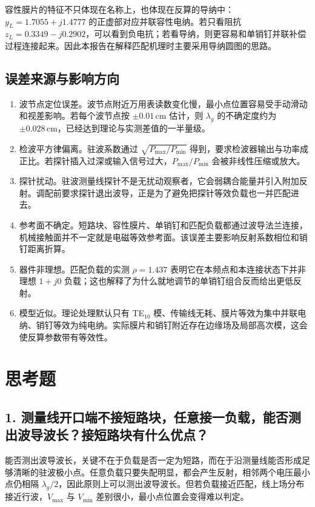 \documentclass[UTF8]{ctexart}
\begin{document}
容性膜片的特征不只体现在名称上，也体现在反算的导纳中：$y_L=1.7055+j1.4777$ 的正虚部对应并联容性电纳。若只看阻抗 $z_L=0.3349-j0.2902$，可以看到负电抗；若看导纳，则更容易和单销钉并联补偿过程连接起来。因此本报告在解释匹配机理时主要采用导纳圆图的思路。

\subsection{误差来源与影响方向}

\begin{enumerate}
  \item 波节点定位误差。波节点附近万用表读数变化慢，最小点位置容易受手动滑动和视差影响。若每个波节点按 $\pm0.01\,\mathrm{cm}$ 估计，则 $\lambda_g$ 的不确定度约为 $\pm0.028\,\mathrm{cm}$，已经达到理论与实测差值的一半量级。
  \item 检波平方律偏离。驻波系数通过 $\sqrt{P_{\max}/P_{\min}}$ 得到，要求检波器输出与功率成正比。若探针插入过深或输入信号过大，$P_{\max}/P_{\min}$ 会被非线性压缩或放大。
  \item 探针扰动。驻波测量线探针不是无扰动观察者，它会弱耦合能量并引入附加反射。调配前要求探针退出波导，正是为了避免把探针等效负载也一并匹配进去。
  \item 参考面不确定。短路块、容性膜片、单销钉和匹配负载都通过波导法兰连接，机械接触面并不一定就是电磁等效参考面。该误差主要影响反射系数相位和销钉距离折算。
  \item 器件非理想。匹配负载的实测 $\rho=1.437$ 表明它在本频点和本连接状态下并非理想 $1+j0$ 负载；这也解释了为什么就地调节的单销钉组合反而给出更低反射。
  \item 模型近似。理论处理默认只有 TE$_{10}$ 模、传输线无耗、膜片等效为集中并联电纳、销钉等效为纯电纳。实际膜片和销钉附近存在边缘场及局部高次模，这会使反算参数带有等效性。
\end{enumerate}

\section{思考题}

\subsection*{1. 测量线开口端不接短路块，任意接一负载，能否测出波导波长？接短路块有什么优点？}

能否测出波导波长，关键不在于负载是否一定为短路，而在于沿测量线能否形成足够清晰的驻波极小点。任意负载只要失配明显，都会产生反射，相邻两个电压最小点仍相隔 $\lambda_g/2$，因此原则上可以测出波导波长。但若负载接近匹配，线上场分布接近行波，$V_{\max}$ 与 $V_{\min}$ 差别很小，最小点位置会变得难以判定。
\end{document}
